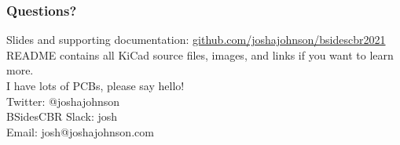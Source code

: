\documentclass[aspectratio=169, t]{beamer}
\begin{document}
\begin{frame}
\frametitle{Questions?}
Slides and supporting documentation: \url{github.com/joshajohnson/bsidescbr2021}\\[10pt]
README contains all KiCad source files, images, and links if you want to learn more.\\[10pt]
I have lots of PCBs, please say hello!\\[10pt]

Twitter: @\textunderscore joshajohnson\\
BSidesCBR Slack: josh\\
Email: josh@joshajohnson.com\\
\end{frame}
\end{document}

